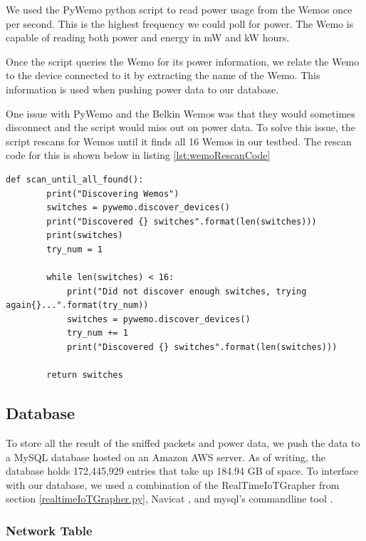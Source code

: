 We used the PyWemo python script \cite{pywemo} to read power usage from the Wemos once per second. This is the highest frequency we could poll for power. The Wemo is capable of reading both power and energy in mW and kW hours.

Once the script queries the Wemo for its power information, we relate the Wemo to the device connected to it by extracting the name of the Wemo. This information is used when pushing power data to our database.

One issue with PyWemo and the Belkin Wemos was that they would sometimes disconnect and the script would miss out on power data. To solve this issue, the script rescans for Wemos until it finds all 16 Wemos in our testbed. The rescan code for this is shown below in listing \ref{lst:wemoRescanCode}

\begin{minipage}{\textwidth}
\begin{lstlisting}[label={lst:wemoRescanCode},caption={Rescan if all wemos not found.}]
    def scan_until_all_found():
        print("Discovering Wemos")
        switches = pywemo.discover_devices()
        print("Discovered {} switches".format(len(switches)))
        print(switches)
        try_num = 1

        while len(switches) < 16:
            print("Did not discover enough switches, trying again{}...".format(try_num))
            switches = pywemo.discover_devices()
            try_num += 1
            print("Discovered {} switches".format(len(switches)))

        return switches
\end{lstlisting}
\end{minipage}

\subsection{Database}
\label{Database}

To store all the result of the sniffed packets and power data, we push the data to a MySQL database hosted on an Amazon AWS server. As of writing, the database holds 172,445,929 entries that take up 184.94 GB of space. To interface with our database, we used a combination of the RealTimeIoTGrapher from section \ref{realtimeIoTGrapher.py}, Navicat \cite{navicat}, and mysql's commandline tool \cite{mysqlCommandline}.

\subsubsection{Network Table}


